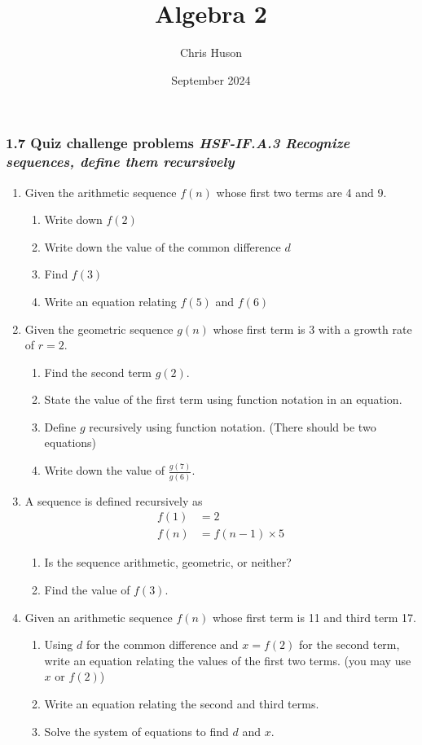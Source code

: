 \documentclass[12pt, twoside]{article}
\title{Algebra 2}
\author{Chris Huson}
\date{September 2024}
\begin{document}
\subsubsection*{1.7 Quiz challenge problems \hfill \textnormal{\textit{HSF-IF.A.3 Recognize sequences, define them recursively}}}

\begin{enumerate}[itemsep=1.5cm]
    \item Given the arithmetic sequence $f(n)$ whose first two terms are 4 and 9.
    \begin{enumerate}[itemsep=1.5cm]
        \item Write down $f(2)$
        \item Write down the value of the common difference $d$
        \item Find $f(3)$
        \item Write an equation relating $f(5)$ and $f(6)$
    \end{enumerate}

    \item Given the geometric sequence $g(n)$ whose first term is 3 with a growth rate of $r=2$.
    \begin{enumerate}[itemsep=1.5cm]
        \item Find the second term $g(2)$.
        \item State the value of the first term using function notation in an equation.
        \item Define $g$ recursively using function notation. (There should be two equations) \vspace{1cm}
        \item Write down the value of $\displaystyle \frac{g(7)}{g(6)}$.
    \end{enumerate}

\newpage
    \item A sequence is defined recursively as 
    \begin{align*}
        f(1) &= 2 \\
        f(n) &= f(n-1) \times 5
    \end{align*}
    \begin{enumerate}[itemsep=0.75cm]
        \item Is the sequence arithmetic, geometric, or neither?
        \item Find the value of $f(3)$.
    \end{enumerate}

    \item Given an arithmetic sequence $f(n)$ whose first term is 11 and third term 17.
    \begin{enumerate}[itemsep=1.5cm]
        \item Using $d$ for the common difference and $x=f(2)$ for the second term, write an equation relating the values of the first two terms. (you may use $x$ or $f(2)$)
        \item Write an equation relating the second and third terms.
        \item Solve the system of equations to find $d$ and $x$.
    \end{enumerate} \vspace{1cm}


\end{enumerate}
\end{document}
